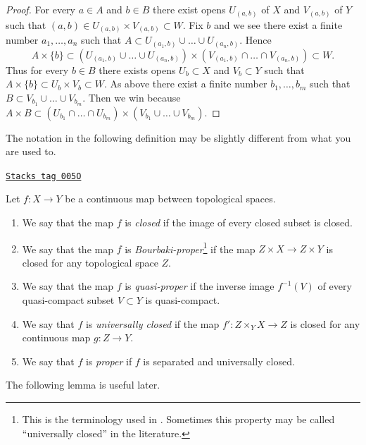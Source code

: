 \begin{proof}
For every $a \in A$ and $b \in B$ there exist opens
$U_{(a, b)}$ of $X$ and $V_{(a, b)}$ of $Y$ such that
$(a, b) \in U_{(a, b)} \times V_{(a, b)} \subset W$.
Fix $b$ and we see there exist a finite number $a_1, \ldots, a_n$
such that $A \subset U_{(a_1, b)} \cup \ldots \cup U_{(a_n, b)}$.
Hence
$$
A \times \{b\} \subset
(U_{(a_1, b)} \cup \ldots \cup U_{(a_n, b)}) \times
(V_{(a_1, b)} \cap \ldots \cap V_{(a_n, b)}) \subset W.
$$
Thus for every $b \in B$ there exists opens $U_b \subset X$ and
$V_b \subset Y$ such that $A \times \{b\} \subset U_b \times V_b \subset W$.
As above there exist a finite number $b_1, \ldots, b_m$ such
that $B \subset V_{b_1} \cup \ldots \cup V_{b_m}$.
Then we win because
$A \times B \subset
(U_{b_1} \cap \ldots \cap U_{b_m}) \times
(V_{b_1} \cup \ldots \cup V_{b_m})$.
\end{proof}

The notation in the following definition may be slightly different
from what you are used to.

\begin{definition}
\label{topology-definition-proper-map}
\href{https://stacks.math.columbia.edu/tag/005O}{\texttt{Stacks tag 005O}}

Let $f : X\to Y$ be a continuous map between topological spaces.
\begin{enumerate}
\item We say that the map $f$ is {\it closed}
if the image of every closed subset is closed.
\item We say that the map $f$ is {\it Bourbaki-proper}\footnote{This is the
terminology used in \cite{Bourbaki}. Sometimes this property may be
called ``universally closed'' in the literature.} if the map
$Z \times X\to Z \times Y$ is closed for any topological space $Z$.
\item We say that the map $f$ is {\it quasi-proper} if
the inverse image $f^{-1}(V)$ of every quasi-compact subset $V \subset Y$
is quasi-compact.
\item We say that $f$ is {\it universally closed} if
the map $f': Z \times_Y X \to Z$ is closed for any continuous map $g: Z \to Y$.
\item We say that $f$ is {\it proper} if $f$ is separated
and universally closed.
\end{enumerate}
\end{definition}

The following lemma is useful later.

